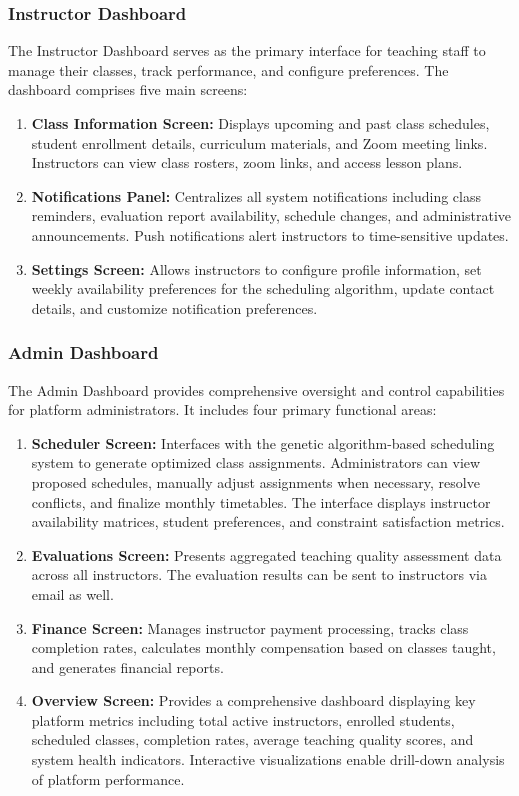 \subsubsection*{Instructor Dashboard}
The Instructor Dashboard serves as the primary interface for teaching staff to manage their classes, track performance, and configure preferences. The dashboard comprises five main screens:
\begin{enumerate}
    \item \textbf{Class Information Screen:} Displays upcoming and past class schedules, student enrollment details, curriculum materials, and Zoom meeting links. Instructors can view class rosters, zoom links, and access lesson plans.
    \item \textbf{Notifications Panel:} Centralizes all system notifications including class reminders, evaluation report availability, schedule changes, and administrative announcements. Push notifications alert instructors to time-sensitive updates.
    \item \textbf{Settings Screen:} Allows instructors to configure profile information, set weekly availability preferences for the scheduling algorithm, update contact details, and customize notification preferences.
\end{enumerate}

\subsubsection*{Admin Dashboard}
The Admin Dashboard provides comprehensive oversight and control capabilities for platform administrators. It includes four primary functional areas:
\begin{enumerate}
    \item \textbf{Scheduler Screen:} Interfaces with the genetic algorithm-based scheduling system to generate optimized class assignments. Administrators can view proposed schedules, manually adjust assignments when necessary, resolve conflicts, and finalize monthly timetables. The interface displays instructor availability matrices, student preferences, and constraint satisfaction metrics.
    \item \textbf{Evaluations Screen:} Presents aggregated teaching quality assessment data across all instructors. The evaluation results can be sent to instructors via email as well.
    \item \textbf{Finance Screen:} Manages instructor payment processing, tracks class completion rates, calculates monthly compensation based on classes taught, and generates financial reports.
    \item \textbf{Overview Screen:} Provides a comprehensive dashboard displaying key platform metrics including total active instructors, enrolled students, scheduled classes, completion rates, average teaching quality scores, and system health indicators. Interactive visualizations enable drill-down analysis of platform performance.
\end{enumerate}

